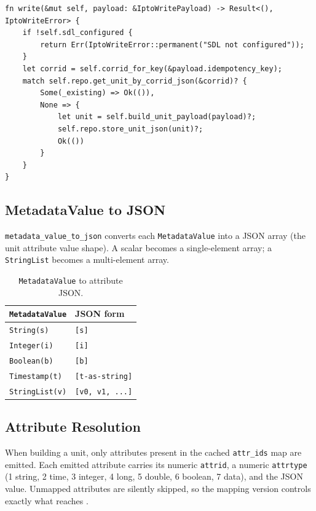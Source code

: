 \begin{lstlisting}
fn write(&mut self, payload: &IptoWritePayload) -> Result<(), IptoWriteError> {
    if !self.sdl_configured {
        return Err(IptoWriteError::permanent("SDL not configured"));
    }
    let corrid = self.corrid_for_key(&payload.idempotency_key);
    match self.repo.get_unit_by_corrid_json(&corrid)? {
        Some(_existing) => Ok(()),
        None => {
            let unit = self.build_unit_payload(payload)?;
            self.repo.store_unit_json(unit)?;
            Ok(())
        }
    }
}
\end{lstlisting}

\subsection{MetadataValue to JSON}

\texttt{metadata\_value\_to\_json} converts each \texttt{MetadataValue} into a
JSON array (the \ipto{} unit attribute value shape). A scalar becomes a
single-element array; a \texttt{StringList} becomes a multi-element array.

\begin{table}[htbp]
\centering
\begin{tabular}{ll}
\hline
\texttt{MetadataValue} & JSON form \\
\hline
\texttt{String(s)} & \texttt{[s]} \\
\texttt{Integer(i)} & \texttt{[i]} \\
\texttt{Boolean(b)} & \texttt{[b]} \\
\texttt{Timestamp(t)} & \texttt{[t-as-string]} \\
\texttt{StringList(v)} & \texttt{[v0, v1, ...]} \\
\hline
\end{tabular}
\caption{\texttt{MetadataValue} to \ipto{} attribute JSON.}
\end{table}

\subsection{Attribute Resolution}

When building a unit, only attributes present in the cached \texttt{attr\_ids}
map are emitted. Each emitted attribute carries its numeric \texttt{attrid}, a
numeric \texttt{attrtype} (1 string, 2 time, 3 integer, 4 long, 5 double, 6
boolean, 7 data), and the JSON value. Unmapped attributes are silently skipped,
so the mapping version controls exactly what reaches \ipto{}.

